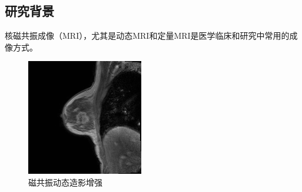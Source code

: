 \documentclass{beamer}
\begin{document}
\subsection{研究背景}
\begin{frame}
核磁共振成像（MRI），尤其是动态MRI和定量MRI是医学临床和研究中常用的成像方式。
\begin{figure}[htbp]
\begin{minipage}[t]{0.35\textwidth}
\centering
\includegraphics[width=\textwidth]{../img/intro/breast.png}
\\ 磁共振动态造影增强
\end{minipage}
\hfill
\begin{minipage}[t]{0.165\textwidth}
\centering

\end{minipage}
\end{figure}
\end{frame}
\end{document}
